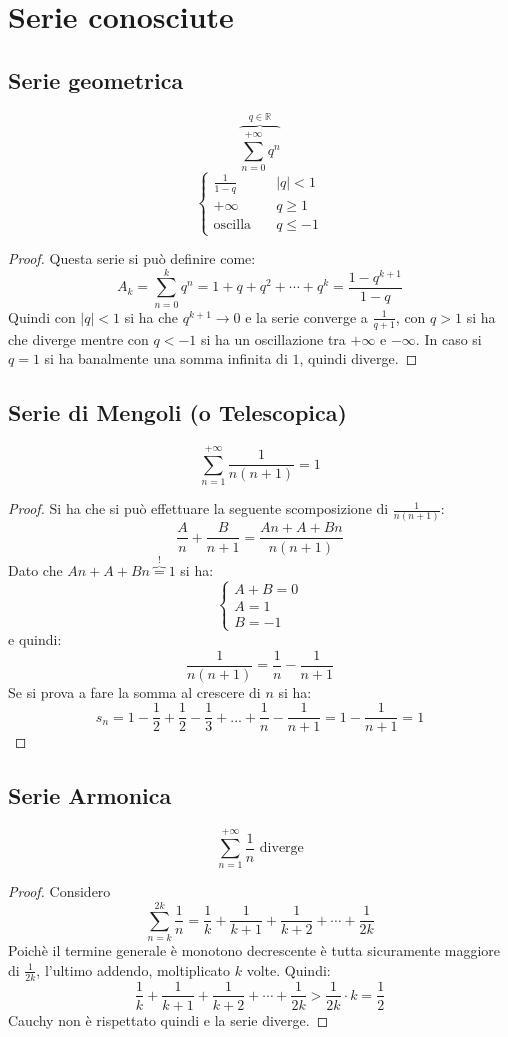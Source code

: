 \documentclass[a4paper,12pt, oneside]{book}
\begin{document}
\section{Serie conosciute}
\subsection{Serie geometrica}
$$\overbrace{\sum_{n=0}^{+\infty} q^{n}}^{q\in \mathbb{R}}$$
$$\left\{
	\begin{array}{ll}
		\frac{1}{1-q}   & \mbox{ } |q|<1    \\
		+\infty         & \mbox{ } q\geq 1  \\
		\mbox{oscilla } & \mbox{ } q\leq -1
	\end{array}
	\right.$$
\begin{proof}
	Questa serie si può definire come:$$A_k=\sum_{n=0}^{k}q^n=1+q+q^2+\cdots+q^k=\frac{1-q^{k+1}}{1-q}$$
	Quindi con $|q|<1$ si ha che $q^{k+1}\rightarrow 0$ e la serie converge a $\frac{1}{q+1}$, con $q>1$ si ha che diverge mentre con $q<-1$ si ha un oscillazione tra $+\infty$ e $-\infty$. In caso si $q=1$ si ha banalmente una somma infinita di $1$, quindi diverge.
\end{proof}
\newpage
\subsection{Serie di Mengoli (o Telescopica)}
$$\sum_{n=1}^{+\infty} \frac{1}{n(n+1)} = 1$$
\begin{proof}
	Si ha che si può effettuare la seguente scomposizione di $\frac{1}{n(n+1)}$:
	$$\frac{A}{n}+\frac{B}{n+1}=\frac{An+A+Bn}{n(n+1)}$$
	Dato che $An+A+Bn \overbrace{=}^{!} 1$ si ha:
	$$\left\{
		\begin{array}{ll}
			A+B=0 \\
			A=1   \\
			B=-1
		\end{array}
		\right.$$
	e quindi: $$\frac{1}{n(n+1)}=\frac{1}{n}-\frac{1}{n+1}$$
	Se si prova a fare la somma al crescere di $n$ si ha:$$s_n=1-\frac{1}{2}+\frac{1}{2}-\frac{1}{3}+...+\frac{1}{n}-\frac{1}{n+1}=1-\frac{1}{n+1}=1$$
\end{proof}
\subsection{Serie Armonica}
$$\sum_{n=1}^{+\infty} \frac{1}{n} \mbox{ diverge}$$
\begin{proof}
	Considero $$\sum_{n=k}^{2k}\frac{1}{n}=\frac{1}{k}+\frac{1}{k+1}+\frac{1}{k+2}+\cdots+\frac{1}{2k}$$
	Poichè il termine generale è monotono decrescente è tutta sicuramente maggiore di $\frac{1}{2k}$, l'ultimo addendo, moltiplicato $k$ volte. Quindi:
	$$\frac{1}{k}+\frac{1}{k+1}+\frac{1}{k+2}+\cdots+\frac{1}{2k}>\frac{1}{2k}\cdot k=	\frac{1}{2}$$
	Cauchy non è rispettato quindi e la serie diverge.
\end{proof}
\end{document}
